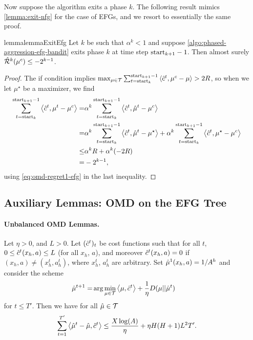 \noindent Now suppose the algorithm exits a phase $k$. The following result mimics \cref{lemma:exit-nfg} for the case of EFGs, and we resort to essentially the same proof.
\begin{restatable}{lemma}{lemmaExitEfg} \label{lemma:exit-efg}
    Let $k$ be such that $\alpha^k<1$ and suppose \cref{algo:phased-aggression-efg-bandit} exits phase $k$ at time step $\text{start}_{k+1}-1$. Then almost surely $\hat{\mathcal{R}}^k(\mu^c)\leq -2^{k-1}$.
\end{restatable}

\begin{proof}
    The if condition implies $\max_{\mu\in\mathcal{T}}\sum_{t = \text{start}_{k}}^{\text{start}_{k+1}-1} \left\langle \hat{c}^t, \mu^c - \mu \right\rangle > 2 R$, so when we let $\mu^{\star}$ be a maximizer, we find
    \begin{align*}
        \sum_{t=\text{start}_{k}}^{\text{start}_{k+1}-1} \left\langle \hat{c}^t, \mu^t-\mu^c \right\rangle =& \alpha^k \sum_{t=\text{start}_{k}}^{\text{start}_{k+1}-1} \left\langle \hat{c}^t, \hat{\mu}^t-\mu^c \right\rangle \nonumber\\
        =& \alpha^k \sum_{t=\text{start}_{k}}^{\text{start}_{k+1}-1} \left\langle \hat{c}^t, \hat{\mu}^t-\mu^{\star} \right\rangle +\alpha^k \sum_{t=\text{start}_{k}}^{\text{start}_{k+1}-1} \left\langle \hat{c}^t, \mu^{\star}-\mu^c \right\rangle \nonumber\\
        \leq& \alpha^k R + \alpha^k(-2R)\nonumber\\
        =& -2^{k-1},
    \end{align*}
    using \cref{eq:omd-regret1-efg} in the last inequality.
\end{proof}

\newpage

\subsection{Auxiliary Lemmas: OMD on the EFG Tree}

\paragraph{Unbalanced OMD Lemmas.}

\begin{lemma} \label{lem:bandit-omd-bounded}
    Let $\eta >0$, and $L>0$. Let $(\hat{c}^t)_t$ be cost functions such that for all $t$, $0\leq \hat{c}^t(x_h,a)\leq L$ (for all $x_h$, $a$), and moreover $\hat{c}^t(x_h,a) = 0$ if $(x_h,a)\neq(x_h^t,a_h^t)$, where $x_h^t$, $a_h^t$ are arbitrary. Set $\hat{\mu}^1(x_h,a) = 1/A^h$ and consider the scheme 
    \begin{align*}
        \hat{\mu}^{t+1} =& \arg\min_{\mu \in \mathcal{T}} \left\langle \mu, \hat{c}^t \right\rangle + \frac{1}{\eta} D(\mu || \hat{\mu}^t)
    \end{align*}
    for $t\leq T'$. Then we have for all $\hat{\mu}\in\mathcal{T}$
    \begin{align*}
        \sum_{t=1}^{T'} \left\langle \hat{\mu}^t-\hat{\mu}, \hat{c}^t \right\rangle \leq \frac{X\log(A)}{\eta} + \eta H(H+1)L^2 T'.
    \end{align*}
\end{lemma}

